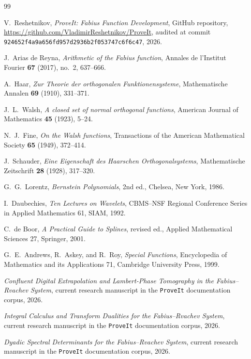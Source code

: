 \documentclass[11pt,oneside]{article}
\theoremstyle{definition}
\theoremstyle{remark}
\newcommand{\repo}{\texttt{ProveIt}}
\begin{document}
\begin{thebibliography}{99}

V.~Reshetnikov,
\emph{ProveIt: Fabius Function Development}, GitHub repository,
\url{https://github.com/VladimirReshetnikov/ProveIt}, audited at commit
\nolinkurl{924652f4a9a656fd957d2936b2f053747c6f6c47}, 2026.

J.~Arias de Reyna,
\emph{Arithmetic of the Fabius function},
Annales de l'Institut Fourier \textbf{67} (2017), no.~2, 637--666.

A.~Haar,
\emph{Zur Theorie der orthogonalen Funktionensysteme},
Mathematische Annalen \textbf{69} (1910), 331--371.

J.~L.~Walsh,
\emph{A closed set of normal orthogonal functions},
American Journal of Mathematics \textbf{45} (1923), 5--24.

N.~J.~Fine,
\emph{On the Walsh functions},
Transactions of the American Mathematical Society \textbf{65} (1949),
372--414.

J.~Schauder,
\emph{Eine Eigenschaft des Haarschen Orthogonalsystems},
Mathematische Zeitschrift \textbf{28} (1928), 317--320.

G.~G.~Lorentz,
\emph{Bernstein Polynomials}, 2nd ed., Chelsea, New York, 1986.

I.~Daubechies,
\emph{Ten Lectures on Wavelets},
CBMS--NSF Regional Conference Series in Applied Mathematics 61, SIAM, 1992.

C.~de Boor,
\emph{A Practical Guide to Splines}, revised ed.,
Applied Mathematical Sciences 27, Springer, 2001.

G.~E.~Andrews, R.~Askey, and R.~Roy,
\emph{Special Functions}, Encyclopedia of Mathematics and its Applications 71,
Cambridge University Press, 1999.

\emph{Confluent Digital Extrapolation and Lambert-Phase Tomography in the
Fabius--Rvachev System}, current research manuscript in the \repo{} documentation
corpus, 2026.

\emph{Integral Calculus and Transform Dualities for the Fabius--Rvachev
System}, current research manuscript in the \repo{} documentation corpus, 2026.

\emph{Dyadic Spectral Determinants for the Fabius--Rvachev System}, current
research manuscript in the \repo{} documentation corpus, 2026.

\end{thebibliography}
\end{document}
